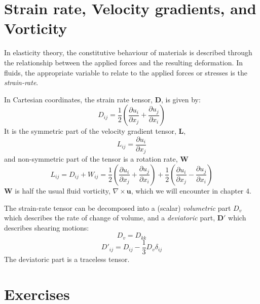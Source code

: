 \documentclass[10pt]{report}
\begin{document}
\section{Strain rate, Velocity gradients, and Vorticity}

In elasticity theory, the constitutive behaviour of materials is described through the relationship
between the applied forces and the resulting deformation. In fluids, the appropriate variable to relate
to the applied forces or stresses is the \textit{strain-rate}.

In Cartesian coordinates, the strain rate tensor, $\mathbf{D}$, is given by:
\begin{equation}
	D_{ij} = \frac{1}{2} \left( \frac{\partial u_{i}}{\partial x_{j}} +
	                            \frac{\partial u_{j}}{\partial x_{i}} \right)
\end{equation}
It is the symmetric part of the velocity gradient tensor, $\mathbf{L}$,
\begin{equation}
	L_{ij} = \frac{\partial u_{i}}{\partial x_{j}}
\end{equation}
and non-symmetric part of the tensor is a rotation rate, $\mathbf{W}$
\begin{equation}
	L_{{ij}} = D_{ij} + W_{ij} = \frac{1}{2} \left( \frac{\partial u_{i}}{\partial x_{j}} +
	                                    \frac{\partial u_{j}}{\partial x_{i}} \right) +
	                             \frac{1}{2} \left( \frac{\partial u_{i}}{\partial x_{j}} -
	                                    \frac{\partial u_{j}}{\partial x_{i}} \right)
\end{equation}
$\mathbf{W}$ is half the usual fluid vorticity, $\nabla \times \mathbf{u}$, which we will encounter in chapter 4.

The strain-rate tensor can be decomposed into a (scalar) \textit{volumetric} part $D_{v}$ which describes the rate
of change of volume, and a \textit{deviatoric} part, $\mathbf{D'}$ which describes shearing motions:
\begin{equation}
	D_{v} = D_{kk}
\end{equation}
\begin{equation}
	D'_{ij} = D_{ij} - \frac{1}{3} D_{v} \delta_{ij}
\end{equation}
The deviatoric part is a traceless tensor.

\divider
\pagebreak


\section{Exercises}
\end{document}
